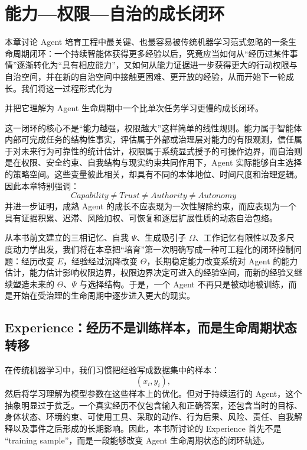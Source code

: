 \chapter{能力—权限—自治的成长闭环}

\begin{chapterlead}
本章讨论 Agent 培育工程中最关键、也最容易被传统机器学习范式忽略的一条生命周期闭环：一个持续智能体获得更多经验以后，究竟应当如何从“经历过某件事情”逐渐转化为“具有相应能力”，又如何从能力证据进一步获得更大的行动权限与自治空间，并在新的自治空间中接触更困难、更开放的经验，从而开始下一轮成长。我们将这一过程形式化为
\begin{statementbox}
\centering
{}
\end{statementbox}
并把它理解为 Agent 生命周期中一个比单次任务学习更慢的成长闭环。

这一闭环的核心不是“能力越强，权限越大”这样简单的线性规则。能力属于智能体内部可完成任务的结构性事实，评估属于外部或治理层对能力的有限观测，信任属于对未来行为可靠性的统计估计，权限属于系统显式授予的可操作边界，而自治则是在权限、安全约束、自我结构与现实约束共同作用下，Agent 实际能够自主选择的策略空间。这些变量彼此相关，却具有不同的本体地位、时间尺度和治理逻辑。因此本章特别强调：
\[
\boxed{
Capability\neq Trust\neq Authority\neq Autonomy
}
\]
并进一步证明，成熟 Agent 的成长不应表现为一次性解除约束，而应表现为一个具有证据积累、迟滞、风险加权、可恢复和逐层扩展性质的动态自治包络。

从本书前文建立的三相记忆、自我 $\Psi$、生成吸引子 $\Omega$、工作记忆有限性以及多尺度动力学出发，我们将在本章把“培育”第一次明确写成一种可工程化的闭环控制问题：经历改变 $E$，经验经过沉降改变 $\Theta$，长期稳定能力改变系统对 Agent 的能力估计，能力估计影响权限边界，权限边界决定可进入的经验空间，而新的经验又继续塑造未来的 $\Theta$、$\Psi$ 与选择结构。于是，一个 Agent 不再只是被动地被训练，而是开始在受治理的生命周期中逐步进入更大的现实。
\end{chapterlead}


\section{Experience：经历不是训练样本，而是生命周期状态转移}

在传统机器学习中，我们习惯把经验写成数据集中的样本：
\[
(x_i,y_i),
\]
然后将学习理解为模型参数在这些样本上的优化。但对于持续运行的 Agent，这个抽象明显过于贫乏。一个真实经历不仅包含输入和正确答案，还包含当时的目标、身体状态、环境约束、可使用工具、采取的动作、行为后果、风险、责任、自我解释以及事件之后形成的长期影响。因此，本书所讨论的 Experience 首先不是 ``training sample''，而是一段能够改变 Agent 生命周期状态的闭环轨迹。

